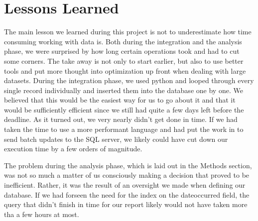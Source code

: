 \section{Lessons Learned}
The main lesson we learned during this project is not to underestimate how time consuming working with data is.
Both during the integration and the analysis phase, we were surprised by how long certain operations took and had to cut some corners.
The take away is not only to start earlier, but also to use better tools and put more thought into optimization up front when dealing with large datasets.
During the integration phase, we used python and looped through every single record individually and inserted them into the database one by one.
We believed that this would be the easiest way for us to go about it and that it would be sufficiently efficient since we still had quite a few days left before the deadline.
As it turned out, we very nearly didn't get done in time. If we had taken the time to use a more performant language and had put the work in to send batch updates to the SQL server, we likely could have cut down our execution time by a few orders of magnitude.

The problem during the analysis phase, which is laid out in the Methods section, was not so much a matter of us consciously making a decision that proved to be inefficient.
Rather, it was the result of an oversight we made when defining our database.
If we had forseen the need for the index on the dateoccurred field, the query that didn't finish in time for our report likely would not have taken more tha a few hours at most.


